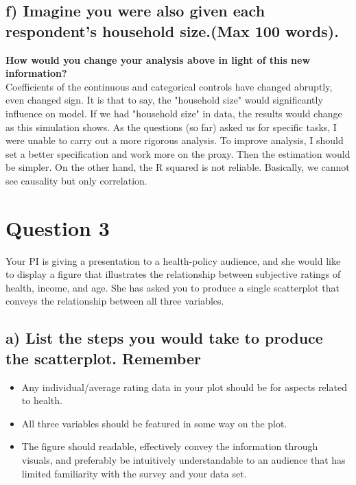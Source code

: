 \documentclass[12pt,a4paper]{article}
\begin{document}
	\subsection*{\normalsize{f) Imagine you were also given each respondent’s household size.(Max 100 words).}}
	
	
	
	 \textbf{How would you change your analysis above in light of this new information?}\\[0.5 cm]	
	 Coefficients of the continuous and categorical controls have changed abruptly, even changed sign. It is that to say, the "household size" would significantly influence on model. If we had "household size" in data, the results would change as this simulation shows.
	 As the questions (so far) asked us for specific tasks, I were unable to carry out a more rigorous analysis. To improve analysis, I should set a better specification and  work more on the proxy. Then the estimation would be simpler. On the other hand, the R squared is not reliable. Basically, we cannot see causality but only correlation.
	 
\section*{{\textcolor[rgb]{0.0667, 0.1255, 0.1922}{Question 3}}}

Your PI is giving a presentation to a health-policy audience, and she would like to display a figure that illustrates the relationship between subjective ratings of health, income, and age. She has asked you to produce a single scatterplot that conveys the relationship between all three variables.

	\subsection*{\normalsize{a) List the steps you would take to produce the scatterplot. Remember}}
	\begin{itemize}
		\item Any individual/average rating data in your plot should be for aspects related to health.
		\item All three variables should be featured in some way on the plot.
		\item The figure should readable, effectively convey the information through visuals, and preferably
		be intuitively understandable to an audience that has limited familiarity with the
		survey and your data set.
	\end{itemize}
\end{document}
